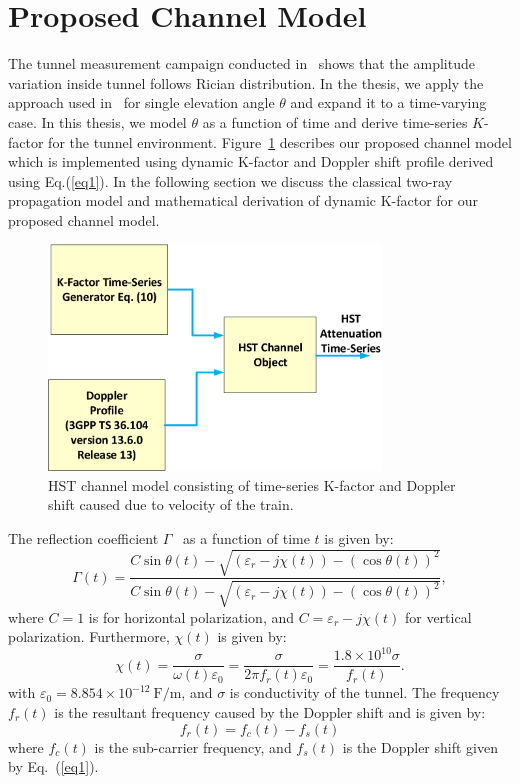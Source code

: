 \section{Proposed Channel Model}

The tunnel measurement campaign conducted in~\cite{inplter8} shows that the amplitude variation inside tunnel follows Rician distribution. In the thesis, we apply the approach used in~\cite{inlter15} for single elevation angle $\theta$ and expand it to a time-varying case. In this thesis, we model $\theta$ as a function of time and derive time-series $K$-factor for the tunnel environment. Figure~\ref{subblock} describes our proposed channel model which is implemented using dynamic K-factor and Doppler shift profile derived using Eq.(\ref{eq1}).  In the following section we discuss the classical two-ray propagation model and mathematical derivation of dynamic K-factor for our proposed channel model.

\begin{figure}[!ht]
\centering
\includegraphics[width=\textwidth,height=6cm,keepaspectratio]{images/Gill/lte_figs/subblock.eps} 
\caption{HST channel model consisting of time-series K-factor and Doppler shift caused due to velocity of the train.}
\label{subblock}
\end{figure}

The reflection coefficient $\Gamma$~\cite{booklter16} as a function of time $t$ is given by:
\begin{equation}
\Gamma(t) = \dfrac{C\sin\theta(t)-\sqrt{(\varepsilon_r-j\chi(t))-(\cos\theta(t))^2}}{C\sin\theta(t)-\sqrt{(\varepsilon_r-j\chi(t))-(\cos\theta(t))^2}},
\end{equation}
where $C = 1$ is for horizontal polarization, and $C = \varepsilon_r-j\chi(t)$ for vertical polarization. Furthermore, $\chi(t)$ is given by:
\begin{equation}
\chi(t) = \dfrac{\sigma}{\omega(t)\varepsilon_0} = \dfrac{\sigma}{2\pi f_r(t) \varepsilon_0} = \dfrac{1.8\times 10^{10}\sigma}{f_r(t)}.
\end{equation}
with $\varepsilon_0 = 8.854\times 10^{-12}~\textrm{F/m}$, and $\sigma$ is conductivity of the tunnel. The frequency $f_r(t)$ is the resultant frequency caused by the Doppler shift and is given by:
\begin{equation}
f_r(t) = f_c(t)-f_s(t)
\end{equation}
where $f_c(t)$ is the sub-carrier frequency, and $f_s(t)$ is the Doppler shift given by Eq.~(\ref{eq1}).

